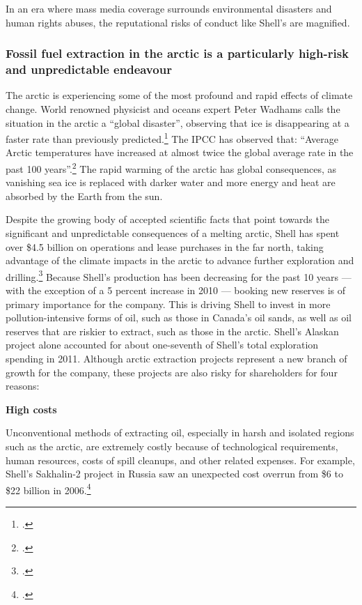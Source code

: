 \documentclass[10pt]{article}
\begin{document}
In an era where mass media coverage surrounds environmental disasters and human rights abuses, the reputational risks of conduct like Shell's are magnified.



	\subsubsection{Fossil fuel extraction in the arctic is a particularly high-risk and unpredictable endeavour}



The arctic is experiencing some of the most profound and rapid effects of climate change.
World renowned physicist and oceans expert Peter Wadhams calls the situation in the arctic a ``global disaster'', observing that ice is disappearing at a faster rate than previously predicted.\footcite{Wadhams2012}
The IPCC has observed that: ``Average Arctic temperatures have increased at almost twice the global average rate in the past 100 years''.\footcite[][Climate Change 2007: Synthesis Report - Observed changes in climate and their effects]{IPCC2007}
The rapid warming of the arctic has global consequences, as vanishing sea ice is replaced with darker water and more energy and heat are absorbed by the Earth from the sun.


Despite the growing body of accepted scientific facts that point towards the significant and unpredictable consequences of a melting arctic, Shell has spent over \$4.5 billion on operations and lease purchases in the far north, taking advantage of the climate impacts in the arctic to advance further exploration and drilling.\footcite{ShellSuspends}
Because Shell's production has been decreasing for the past 10 years --- with the exception of a 5 percent increase in 2010  --- booking new reserves is of primary importance for the company.
This is driving Shell to invest in more pollution-intensive forms of oil, such as those in Canada's oil sands, as well as oil reserves that are riskier to extract, such as those in the arctic.
Shell's Alaskan project alone accounted for about one-seventh of Shell's total exploration spending in 2011. 
Although arctic extraction projects represent a new branch of growth for the company, these projects are also risky for shareholders for four reasons:



\textbf{High costs} 



Unconventional methods of extracting oil, especially in harsh and isolated regions such as the arctic, are extremely costly because of technological requirements, human resources, costs of spill cleanups, and other related expenses. 
For example,  Shell's Sakhalin-2 project in Russia saw an unexpected cost overrun from \$6 to \$22 billion in 2006.\footcite[For more on these four central risk factors see: ][]{OutInTheCold_2012}
\end{document}
